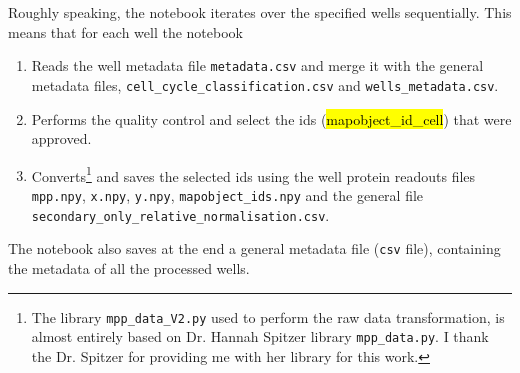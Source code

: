 
Roughly speaking, the notebook iterates over the specified wells sequentially. This means that for each well the notebook
\begin{enumerate}
  \item Reads the well metadata file \texttt{metadata.csv} and merge it with the general metadata files, \texttt{cell\_cycle\_classification.csv} and \texttt{wells\_metadata.csv}.
  \item Performs the quality control and select the ids (\hl{mapobject\_id\_cell}) that were approved.
  \item Converts\footnote{The library \texttt{mpp\_data\_V2.py} used to perform the raw data transformation, is almost entirely based on Dr. Hannah Spitzer library \texttt{mpp\_data.py}. I thank the Dr. Spitzer for providing me with her library for this work.} and saves the selected ids using the well protein readouts files \texttt{mpp.npy}, \texttt{x.npy}, \texttt{y.npy}, \texttt{mapobject\_ids.npy} and the general file \\ \texttt{secondary\_only\_relative\_normalisation.csv}.
\end{enumerate}

The notebook also saves at the end a general metadata file (\texttt{csv} file), containing the metadata of all the processed wells.
